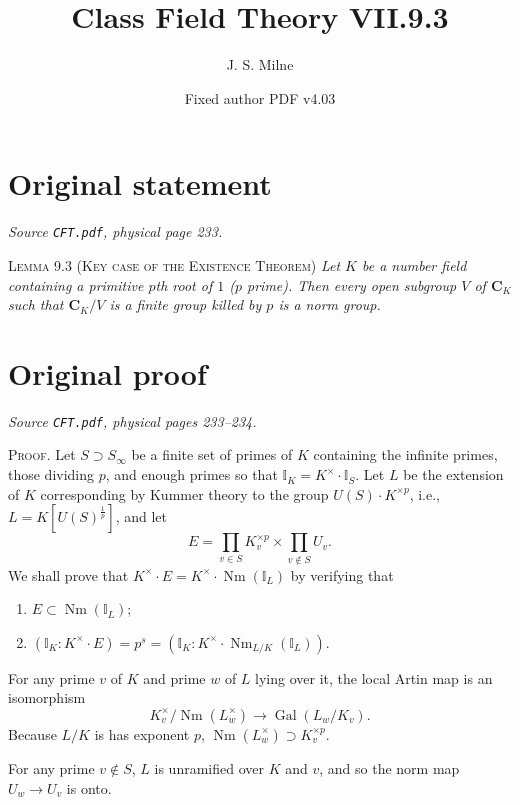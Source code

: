 \documentclass[11pt,a4paper]{article}
\title{Class Field Theory VII.9.3}
\author{J. S. Milne}
\date{Fixed author PDF v4.03}
\begin{document}
\maketitle
\section*{Original statement}
\noindent\emph{Source \texttt{CFT.pdf}, physical page 233.}\par\medskip
\noindent\textsc{Lemma 9.3 (Key case of the Existence Theorem)}
\emph{Let $K$ be a number field containing a primitive $p$th root of $1$
($p$ prime). Then every open subgroup $V$ of $\boldsymbol{C}_K$ such
that $\boldsymbol{C}_K/V$ is a finite group killed by $p$ is a norm
group.}

\section*{Original proof}
\noindent\emph{Source \texttt{CFT.pdf}, physical pages 233--234.}\par\medskip
\noindent\textsc{Proof.} Let $S\supset S_\infty$ be a finite set of
primes of $K$ containing the infinite primes, those dividing $p$,
and enough primes so that $\mathbb{I}_K=K^\times\cdot\mathbb{I}_S$.
Let $L$ be the extension of $K$ corresponding by Kummer theory to the
group $U(S)\cdot K^{\times p}$, i.e., $L=K[U(S)^{\frac{1}{p}}]$, and let
\[
E=\prod_{v\in S}K_v^{\times p}\times\prod_{v\notin S}U_v.
\]
We shall prove that $K^\times\cdot E=K^\times\cdot
\operatorname{Nm}(\mathbb{I}_L)$ by verifying that
\begin{enumerate}
\renewcommand{\labelenumi}{(\alph{enumi})}
\item $E\subset\operatorname{Nm}(\mathbb{I}_L)$;
\item $(\mathbb{I}_K:K^\times\cdot E)=p^s=
(\mathbb{I}_K:K^\times\cdot\operatorname{Nm}_{L/K}(\mathbb{I}_L))$.
\end{enumerate}

For any prime $v$ of $K$ and prime $w$ of $L$ lying over it, the local
Artin map is an isomorphism
\[
K_v^\times/\operatorname{Nm}(L_w^\times)\longrightarrow
\operatorname{Gal}(L_w/K_v).
\]
Because $L/K$ is has exponent $p$,
$\operatorname{Nm}(L_w^\times)\supset K_v^{\times p}$.

For any prime $v\notin S$, $L$ is unramified over $K$ and $v$, and so
the norm map $U_w\longrightarrow U_v$ is onto.
\end{document}
